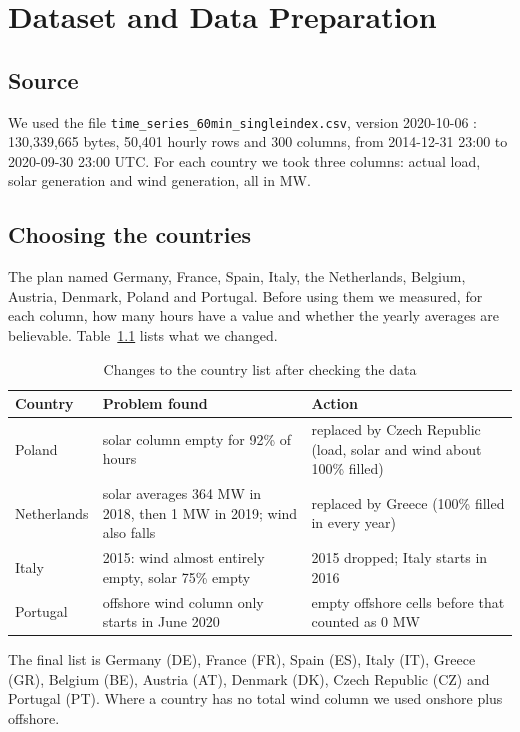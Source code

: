 \documentclass[12pt,a4paper]{report}
\begin{document}
\chapter{Dataset and Data Preparation}\label{ch:data}

\section{Source}
We used the file \texttt{time\_series\_60min\_singleindex.csv}, version 2020-10-06 \cite{opsd2020}: 130,339,665 bytes, 50,401 hourly rows and 300 columns, from 2014-12-31 23:00 to 2020-09-30 23:00 UTC. For each country we took three columns: actual load, solar generation and wind generation, all in MW.

\section{Choosing the countries}
The plan named Germany, France, Spain, Italy, the Netherlands, Belgium, Austria, Denmark, Poland and Portugal. Before using them we measured, for each column, how many hours have a value and whether the yearly averages are believable. Table~\ref{tab:swap} lists what we changed.

\begin{table}[H]
\centering\small
\caption{Changes to the country list after checking the data}\label{tab:swap}
\begin{tabularx}{\textwidth}{lXX}
\toprule
Country & Problem found & Action\\
\midrule
Poland & solar column empty for 92\% of hours & replaced by Czech Republic (load, solar and wind about 100\% filled)\\
Netherlands & solar averages 364 MW in 2018, then 1 MW in 2019; wind also falls & replaced by Greece (100\% filled in every year)\\
Italy & 2015: wind almost entirely empty, solar 75\% empty & 2015 dropped; Italy starts in 2016\\
Portugal & offshore wind column only starts in June 2020 & empty offshore cells before that counted as 0 MW\\
\bottomrule
\end{tabularx}
\end{table}

The final list is Germany (DE), France (FR), Spain (ES), Italy (IT), Greece (GR), Belgium (BE), Austria (AT), Denmark (DK), Czech Republic (CZ) and Portugal (PT). Where a country has no total wind column we used onshore plus offshore.
\end{document}
